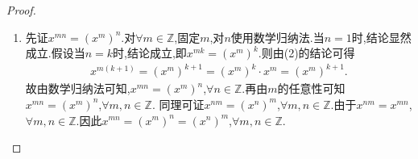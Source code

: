 \documentclass[../../main.tex]{subfiles}
\begin{document}
\begin{proof}
\begin{enumerate}[(1)]
(iv)若 $n\geq m'$,则$x^{m + n}=x^{n-m'}$。而 $x^m\cdot x^n=(x^{-1})^{m'}\cdot x^n$.于是
\begin{align*}
&\quad \quad x^{m+n}=x^m\cdot x^n
\\
&\Leftrightarrow x^{n-m'}=(x^{-1})^{m'}\cdot x^n
\\
&\Leftrightarrow \underset{n-m' \text{个}}{\underbrace{x\cdots x}}=\left( x^{-1} \right) ^{m'}\cdot \left( \underset{n\text{个}}{\underbrace{x\cdots x}} \right) 
\end{align*}
对上式两边右乘$(x^{-1})^{n-m'}$，得到
\begin{align*}
&\quad \quad x^{m+n}=x^m\cdot x^n\Leftrightarrow \underset{n-m' \text{个}}{\underbrace{x\cdots x}}=\left( x^{-1} \right) ^{m'}\cdot \left( \underset{n\text{个}}{\underbrace{x\cdots x}} \right) 
\\
&\Leftrightarrow \left( \underset{n-m' \text{个}}{\underbrace{x\cdots x}} \right) \cdot \left( x^{-1} \right) ^{n-m'}=\left( x^{-1} \right) ^{m'}\cdot \left( \underset{n\text{个}}{\underbrace{x\cdots x}} \right) \cdot \left( x^{-1} \right) ^{n-m'}
\\
&\Leftrightarrow \left( \underset{n-m' \text{个}}{\underbrace{x\cdots x}} \right) \cdot \left( \underset{n-m' \text{个}}{\underbrace{x^{-1}\cdots x^{-1}}} \right) =\left( x^{-1} \right) ^{m'}\cdot \left( \underset{n\text{个}}{\underbrace{x\cdots x}} \right) \cdot \left( \underset{n-m' \text{个}}{\underbrace{x^{-1}\cdots x^{-1}}} \right) 
\\
&\Leftrightarrow e=\left( x^{-1} \right) ^{m'}\cdot \left( \underset{m' \text{个}}{\underbrace{x\cdots x}} \right) \Leftrightarrow e=\left( x^{-1} \right) ^{m'}\cdot x^{m'}
\end{align*}
上式最后一个等式显然成立,故此时结论成立.

\item 先证$x^{mn}=(x^m)^n$.对$\forall m\in \mathbb{Z}$,固定$m$,对$n$使用数学归纳法.当$n=1$时,结论显然成立.假设当$n=k$时,结论成立,即$x^{mk}=\left( x^m \right) ^k$.则由(2)的结论可得
\begin{align*}
x^{m\left( k+1 \right)}=\left( x^m \right) ^{k+1}=\left( x^m \right) ^k\cdot x^m=\left( x^m \right) ^{k+1}.
\end{align*}
故由数学归纳法可知,$x^{mn}=(x^m)^n$,$\forall n\in \mathbb{Z}$.再由$m$的任意性可知$x^{mn}=(x^m)^n$,$\forall m,n\in \mathbb{Z}$.
同理可证$x^{nm}=(x^n)^m$,$\forall m,n\in \mathbb{Z}$.由于$x^{nm}=x^{mn}$,$\forall m,n\in \mathbb{Z}$.因此$x^{mn}=(x^m)^n=(x^n)^m$,$\forall m,n\in \mathbb{Z}$.
\end{enumerate}
\end{proof}
\end{document}
